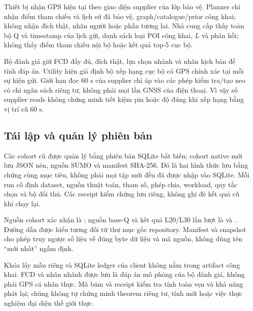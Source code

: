 Thiết bị nhận GPS hiện tại theo giao diện supplier của lớp bảo vệ. Planner chỉ nhận điểm tham chiếu và lịch sử đã bảo vệ, graph/catalogue/prior công khai; không nhận đích thật, nhãn người hoặc phần tương lai. Nhà cung cấp thấy toàn bộ Q và timestamp của lịch gửi, danh sách loại POI công khai, $L$ và phản hồi; không thấy điểm tham chiếu nội bộ hoặc kết quả top-5 cục bộ.

Bộ đánh giá giữ FCD đầy đủ, đích thật, lựa chọn nhánh và nhãn kịch bản để tính đáp án. Utility hiện giả định bộ xếp hạng cục bộ có GPS chính xác tại mỗi sự kiện gửi. Giới hạn đọc 60 s của supplier chỉ áp vào các phép kiểm tra/tạo neo có chi ngân sách riêng tư, không phải mọi lần GNSS của điện thoại. Vì vậy số supplier reads không chứng minh tiết kiệm pin hoặc độ đúng khi xếp hạng bằng vị trí cũ 60 s.

\subsection{Tái lập và quản lý phiên bản}

Các cohort cũ được quản lý bằng phiên bản SQLite bất biến; cohort native mới lưu JSON nén, nguồn SUMO và manifest SHA-256. Đó là hai hình thức lưu bằng chứng cùng mục tiêu, không phải mọi tập mới đều đã được nhập vào SQLite. Mỗi run cố định dataset, nguồn thuật toán, tham số, phép chia, workload, quy tắc chọn và bộ đối thủ. Các receipt kiểm chứng lưu riêng, không ghi đè kết quả cũ khi chạy lại.

Nguồn cohort xác nhận là ; nguồn base-Q và kết quả L20/L30 lần lượt là  và . Đường dẫn được hiểu tương đối từ thư mục gốc repository. Manifest và snapshot cho phép truy ngược số liệu về đúng byte dữ liệu và mã nguồn, không dùng tên ``mới nhất'' ngầm định.

Khóa lấy mẫu riêng và SQLite ledger của client không nằm trong artifact công khai. FCD và nhãn nhánh được lưu là đáp án mô phỏng của bộ đánh giá, không phải GPS cá nhân thực. Mã băm và receipt kiểm tra tính toàn vẹn và khả năng phát lại; chúng không tự chứng minh theorem riêng tư, tính mới hoặc việc thực nghiệm đại diện thế giới thực.
